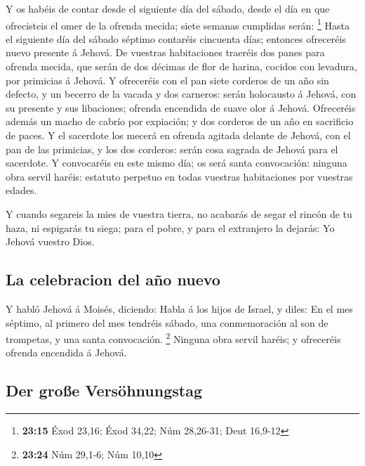  Y os habéis de contar desde el siguiente día del sábado,
desde el día en que ofrecisteis el omer de la ofrenda mecida; siete
semanas cumplidas serán: \footnote{\textbf{23:15} Éxod 23,16; Éxod
  34,22; Núm 28,26-31; Deut 16,9-12}  Hasta el siguiente
día del sábado séptimo contaréis cincuenta días; entonces ofreceréis
nuevo presente á Jehová.  De vuestras habitaciones traeréis
dos panes para ofrenda mecida, que serán de dos décimas de flor de
harina, cocidos con levadura, por primicias á Jehová.  Y
ofreceréis con el pan siete corderos de un año sin defecto, y un becerro
de la vacada y dos carneros: serán holocausto á Jehová, con su presente
y sus libaciones; ofrenda encendida de suave olor á Jehová.
 Ofreceréis además un macho de cabrío por expiación; y dos
corderos de un año en sacrificio de paces.  Y el sacerdote
los mecerá en ofrenda agitada delante de Jehová, con el pan de las
primicias, y los dos corderos: serán cosa sagrada de Jehová para el
sacerdote.  Y convocaréis en este mismo día; os será santa
convocación: ninguna obra servil haréis: estatuto perpetuo en todas
vuestras habitaciones por vuestras edades.

 Y cuando segareis la mies de vuestra tierra, no acabarás
de segar el rincón de tu haza, ni espigarás tu siega; para el pobre, y
para el extranjero la dejarás: Yo Jehová vuestro Dios.

\hypertarget{la-celebracion-del-auxf1o-nuevo}{%
\subsection{La celebracion del año
nuevo}\label{la-celebracion-del-auxf1o-nuevo}}

 Y habló Jehová á Moisés, diciendo:  Habla á
los hijos de Israel, y diles: En el mes séptimo, al primero del mes
tendréis sábado, una conmemoración al son de trompetas, y una santa
convocación. \footnote{\textbf{23:24} Núm 29,1-6; Núm 10,10}
 Ninguna obra servil haréis; y ofreceréis ofrenda encendida
á Jehová.

\hypertarget{der-grouxdfe-versuxf6hnungstag}{%
\subsection{Der große
Versöhnungstag}\label{der-grouxdfe-versuxf6hnungstag}}

